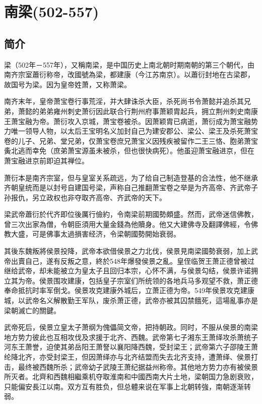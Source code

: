 

\section{南梁\tiny(502-557)}

\subsection{简介}

梁（502年－557年），又稱南梁，是中国历史上南北朝时期南朝的第三个朝代，由南齐宗室蕭衍称帝，改國號為梁，都建康（今江苏南京）。以蕭衍封地在古梁郡，故国号为梁。因为皇帝姓萧，又称萧梁。

南齐末年，皇帝萧宝卷行事荒淫，并大肆诛杀大臣，杀死尚书令萧懿并追杀其兄弟，萧懿的弟弟雍州刺史萧衍因此联合行荆州府事萧颖胄起兵，拥立荆州刺史南康王萧宝融为帝。萧衍攻入京城，萧宝卷被杀。因萧颖胄已病逝，萧衍成为萧宝融势力唯一领导人物，以太后王宝明名义加封自己为建安郡公、梁公、梁王及杀死萧宝卷的儿子、兄弟、堂兄弟，仅萧宝卷庶兄萧宝义因残疾被留作二王三恪、胞弟萧宝夤北逃而幸免（庶弟萧宝源虽未被杀，但也很快病死）。他虽迎萧宝融进京，但在萧宝融进京前即迫其禅位。

萧衍本是南齐宗室，但与皇室关系疏远，为了给自己制造登基的合法性，他不继承齐朝皇统而是以封号自建国号梁，声称自己推翻萧宝卷之举是为齐高帝、齐武帝子孙报仇，另立政权也非夺取齐高帝、齐武帝的天下。

梁武帝蕭衍於代齐即位後厲行儉約，令南梁前期國勢頗盛。然而，武帝迷信佛教，曾三次出家為僧，令朝臣須用大量金錢為他贖身。他又大建佛寺及翻譯佛經，令佛教大盛，可是佛事太過損害经济，令梁朝國勢開始衰弱。

其後东魏叛將侯景投降，武帝本欲借侯景之力北伐，侯景見南梁國勢衰弱，加上武帝出賣自己，遂有反叛之意，終於548年爆發侯景之亂。皇侄临贺王萧正德曾被过继给武帝，却未能被立为皇太子且回归本宗，心怀不满，与侯景勾结，侯景许诺拥立其为帝。侯景围攻建康，包括皇子宗室们所统领的各地兵马多观望不救，萧正德奉命抵抗时率军倒戈。侯景攻克建康外城后，立萧正德为帝。549年侯景攻克建康城，以武帝名义解散勤王军队，废杀萧正德，武帝亦被其囚禁餓死，這場亂事亦是梁朝滅亡的關鍵。

武帝死后，侯景立皇太子萧纲为傀儡简文帝，把持朝政。同时，不服从侯景的南梁地方势力彼此也互相攻伐及求援于北齐、西魏。武帝第七子湘东王萧绎攻杀萧统子河东王萧誉，迫使其弟岳阳王萧詧以襄阳降西魏，受封梁王；武帝第六子邵陵王萧纶降北齐，亦受封梁王，但因萧绎亦与北齐结盟而失去北齐支持，遭萧绎、侯景打击，最终被西魏所杀；武帝幼子武陵王萧纪据益州称帝。其他地方势力亦有被侯景所灭者。北齊和西魏相繼乘机夺取淮南和中國西南大片土地，梁朝国力急剧衰败，只能偏安長江以南。双方互有胜负，但总體来说在军事上北朝转強，南朝逐渐转弱。

